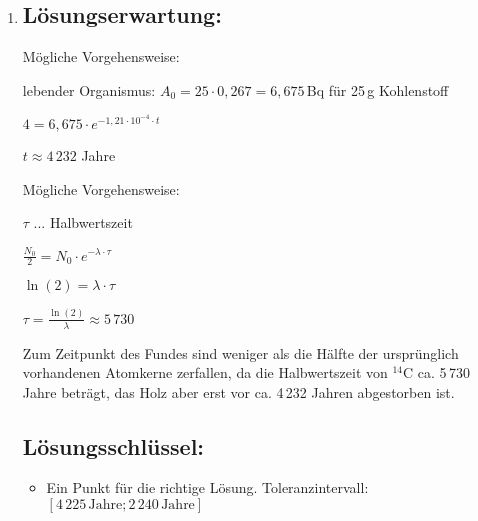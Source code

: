 \begin{langesbeispiel}
{\begin{enumerate}
$A(t)=|N'(t)|=\lambda\cdot N_0\cdot e^{-\lambda\cdot t}$

$A_0=\lambda\cdot N_0$\leer

$N_0=\frac{A_0}{\lambda}=\frac{17}{4,92\cdot 10^{-18}}\approx 3,46\cdot 10^{18}$

Zum Zeitpunkt $t=0$ befinden sich ca. $3,46\cdot 10^{18}$ Atomkerne von $^238$U in der Probe.

\subsection{Lösungsschlüssel:}
\begin{itemize}
	\item Ein Punkt für eine korrekte Formel. Äquivalente Formeln sind als richtig zu werten.
	\item Ein Punkt für die richtige Lösung. Toleranzintervall: $[3,4\cdot 10^{18}\,\text{Atomkerne}; 3,5\cdot 10^{18}\,\text{Atomkerne}]$
\end{itemize}

	\item \subsection{Lösungserwartung:}

Mögliche Vorgehensweise:

lebender Organismus: $A_0=25\cdot 0,267=6,675$\,Bq für 25\,g Kohlenstoff

$4=6,675\cdot e^{-1,21\cdot 10^{-4}\cdot t}$

$t\approx 4\,232$ Jahre\leer

Mögliche Vorgehensweise:

$\tau$ ... Halbwertszeit

$\frac{N_0}{2}=N_0\cdot e^{-\lambda\cdot\tau}$

$\ln(2)=\lambda\cdot\tau$

$\tau=\frac{\ln(2)}{\lambda}\approx 5\,730$\leer

Zum Zeitpunkt des Fundes sind weniger als die Hälfte der ursprünglich vorhandenen Atomkerne zerfallen, da die Halbwertszeit von $^14$C ca. 5\,730 Jahre beträgt, das Holz aber erst vor ca. 4\,232 Jahren abgestorben ist.

\subsection{Lösungsschlüssel:}
\begin{itemize}
	\item Ein Punkt für die richtige Lösung. Toleranzintervall: $[4\,225\,\text{Jahre};2\,240\,\text{Jahre}]$
	

\end{itemize}
\end{enumerate}}
\end{langesbeispiel}
